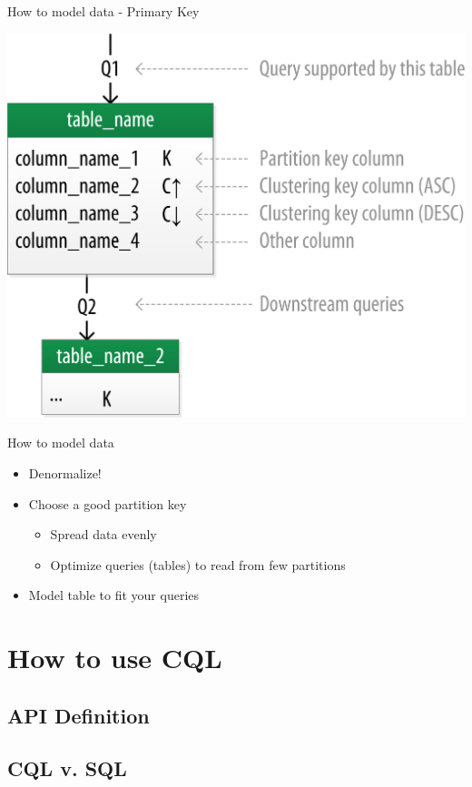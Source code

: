 \documentclass[
  10pt
]{beamer}
\begin{document}
\begin{frame}{How to model data - Primary Key \cite{cassandra_oreilly}}
  \begin{center}
    \includegraphics[width=0.75\columnwidth]{resources/model_example_primary_key.jpeg}
  \end{center}
\end{frame}

\begin{frame}{How to model data}
  \begin{itemize}
    \item Denormalize!
    \item Choose a good partition key
      \begin{itemize}
        \item Spread data evenly
        \item Optimize queries (tables) to read from few partitions
      \end{itemize}
    \item Model table to fit your queries
  \end{itemize}
\end{frame}

\section{How to use CQL}  %

\subsection{API Definition}
\subsection{CQL v. SQL}
\end{document}
